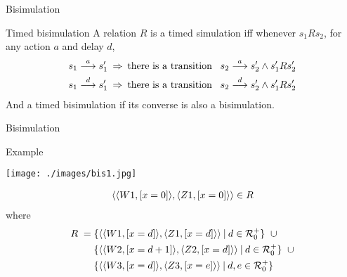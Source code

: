 \documentclass{beamer}
\def\dkb#1{{\blue #1}}
\def\R{\mathcal{R}}
\begin{document}
\begin{slide}{Bisimulation}
\small

\begin{block}{Timed bisimulation}
A relation $R$ is a \dkb{timed simulation} iff whenever $s_1 R s_2$, for any action $a$ and delay $d$,
\begin{align*}
s_1\stackrel{a}{\longrightarrow} s_1'\; & \mathbin{\Rightarrow}\; \text{there is a transition}\; \; \; s_2 \stackrel{a}{\longrightarrow} s_2' \mathbin{\wedge} s_1' R s_2'\\
s_1 \stackrel{d}{\longrightarrow} s_1'\; & \mathbin{\Rightarrow}\; \text{there is a transition}\; \; \; s_2 \stackrel{d}{\longrightarrow} s_2' \mathbin{\wedge} s_1' R s_2'
\end{align*}
And a \dkb{timed bisimulation} if its converse is also a bisimulation.
\end{block}
\end{slide}

\begin{slide}{Bisimulation}
\small

\begin{block}{Example}

\texttt{[image: ./images/bis1.jpg]} 
\end{block}

\begin{align*}
\mathopen{\langle}\mathopen{\langle}W1,[x=0]\mathclose{\rangle}, \mathopen{\langle}Z1,[x=0]\mathclose{\rangle} \mathclose{\rangle} \in R
\end{align*}
where
\begin{align*}
R \; =\;  & \setdef{\pair{\pair{W1,[x=d]}, \pair{Z1,[x=d]} } }{d \in \R_0^+}\; \;   \cup\\
              & \setdef{\pair{\pair{W2,[x=d+1]}, \pair{Z2,[x=d]} } }{d \in \R_0^+}\; \;  \cup\\
              & \setdef{\pair{\pair{W3,[x=d]}, \pair{Z3,[x=e]} } }{d,e \in \R_0^+}  
\end{align*}


\end{slide}
\end{document}
